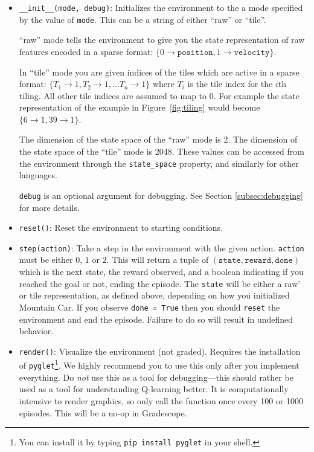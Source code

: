 \documentclass[11pt,addpoints,answers]{exam}
\begin{document}
\begin{itemize}
    \item \texttt{\_\_init\_\_(mode, debug)}: Initializes the environment to the a mode specified by the value of \texttt{mode}. This can be a string of either ``raw'' or ``tile''. 
    
    ``raw'' mode tells the environment to give you the state representation of raw features encoded in a sparse format: $\{0 \rightarrow \texttt{position}, 1 \rightarrow \texttt{velocity}\}$.
    
    In ``tile'' mode you are given indices of the tiles which are active in a sparse format: $\{T_1 \rightarrow 1, T_2 \rightarrow 1, \ldots T_n \rightarrow 1\}$ where $T_i$ is the tile index for the $i$th tiling. All other tile indices are assumed to map to 0. For example the state representation of the example in Figure~\ref{fig:tiling} would become $\{6 \rightarrow 1, 39 \rightarrow 1\}$.
    
    The dimension of the state space of the ``raw'' mode is 2. The dimension of the state space of the ``tile'' mode is 2048. These values can be accessed from the environment through the \texttt{state\_space} property, and similarly for other languages.
    
    \texttt{debug} is an optional argument for debugging. See Section \ref{subsec:debugging} for more details.
    
    \item \texttt{reset()}: Reset the environment to starting conditions.
        \item \texttt{step(action)}: Take a step in the environment with the given action. \texttt{action} must be either $0$, $1$ or $2$. This will return a tuple of $(\texttt{state}, \texttt{reward}, \texttt{done})$ which is the next state, the reward observed, and a boolean indicating if you reached the goal or not, ending the episode. The \texttt{state} will be either a raw' or tile representation, as defined above, depending on how you initialized Mountain Car.  If you observe \texttt{done = True} then you should \texttt{reset} the environment and end the episode. Failure to do so will result in undefined behavior.
    \item \texttt{render()}: Visualize the environment (not graded). Requires the installation of \texttt{pyglet}\footnote{You can install it by typing \texttt{pip install pyglet} in your shell.}. We highly recommend you to use this only after you implement everything. Do \emph{not} use this as a tool for debugging---this should rather be used as a tool for understanding Q-learning better. It is computationally intensive to render graphics, so only call the function once every 100 or 1000 episodes. This will be a no-op in Gradescope.
\end{itemize}
\end{document}
